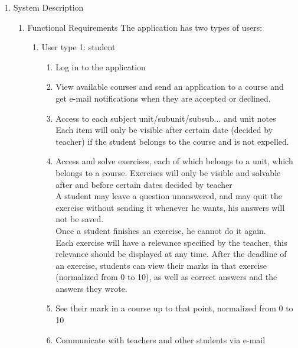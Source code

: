 \documentclass{article}
\begin{document}
\begin{enumerate}
	\item{System Description}
	\begin{enumerate}
		\item{Functional Requirements}
		The application has two types of users:
		\begin{enumerate}
			\item User type 1: student
			\begin{enumerate}
				\item Log in to the application\\
				\item View available courses and send an application to a course and get e-mail notifications when they are accepted or declined.\\
				\item Access to each subject unit/subunit/subsub... and unit notes\\
				Each item will only be visible after certain date (decided by teacher) if the student belongs to the course and is not expelled.\\
				\item Access and solve exercises, each of which belongs to a unit, which belongs to a course. Exercises will only be visible and solvable after and before certain dates decided by teacher \\
				A student may leave a question unanswered, and may quit the exercise without sending it whenever he wants, his answers will not be saved.\\
				Once a student finishes an exercise, he cannot do it again. \\
				Each exercise will have a relevance specified by the teacher, this relevance should be displayed at any time.
				After the deadline of an exercise, students can view their marks in that exercise (normalized from 0 to 10), as well as correct answers and the answers they wrote.\\
				\item See their mark in a course up to that point, normalized from 0 to 10 \\
				\item Communicate with teachers and other students via e-mail		\\
				

\end{enumerate}
\end{enumerate}
\end{enumerate}
\end{enumerate}
\end{document}
